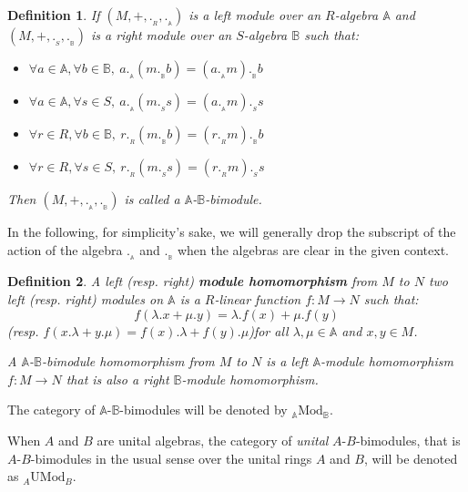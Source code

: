 \documentclass[a4paper,fleqn]{cas-sc}
\newtheorem{dfnt}{Definition}%
\newcommand{\bA}{\mathbb{A}}
\newcommand{\bB}{\mathbb{B}}
\newcommand{\md}{\mathrm{UMod}}
\newcommand{\qmod}{\mathrm{Mod}}
\begin{document}
\begin{dfnt}
If $(M, +, ._{_R}, ._{_\bA})$ is a left module over an $R$-algebra $\bA$ and $(M, +, ._{_S}, ._{_\bB})$ is a right module over an $S$-algebra $\bB$ such that: 
\begin{itemize}
    \item \( \forall a \in \bA, \forall b \in \bB, \
    a._{_\bA}(m._{_\bB} b) = (a._{_\bA} m)._{_\bB} b\)
    \item \(\forall a \in \bA, \forall s \in S, \
    a._{_\bA} (m._{_S} s) = (a._{_\bA} m)._{_S} s\)
    \item \(\forall r \in R, \forall b \in \bB, \
    r._{_R} (m._{_\bB} b) = (r._{_R} m)._{_\bB} b\)
    \item \(\forall r \in R, \forall s \in S, \
    r._{_R} (m._{_S} s) = (r._{_R} m)._{_S} s\)
\end{itemize}
Then $(M, +, ._{_\bA}, ._{_\bB})$ is called a $\bA$-$\bB$-bimodule.
\end{dfnt}

In the following, for simplicity's sake, we will generally drop the subscript of the action of the algebra $._{_\bA}$ and $._{_\bB}$ when the algebras are clear in the given context.

\begin{dfnt}
 A left (resp. right) \textbf{module homomorphism} from $M$ to $N$ two left (resp. right) modules on $\bA$ is a $R$-linear function $f: M \to N$ such that:
 \[f(\lambda .x + \mu .y) = \lambda .f(x) + \mu .f(y)\]
 (resp. $f(x.\lambda + y.\mu) = f(x).\lambda + f(y).\mu$)for all $\lambda, \mu \in \bA$ and $x, y \in M$.
 
 A $\bA$-$\bB$-bimodule homomorphism from $M$ to $N$ is a left $\bA$-module homomorphism $f : M \to N$ that is also a right $\bB$-module homomorphism.
\end{dfnt}


The category of $\bA$-$\bB$-bimodules will be denoted by $_\bA \qmod_\bB$. 

When $A$ and $B$ are unital algebras, the category of \textit{unital} $A$-$B$-bimodules, that is $A$-$B$-bimodules in the usual sense over the unital rings $A$ and $B$, will be denoted as $_A \md_B$.
\end{document}
